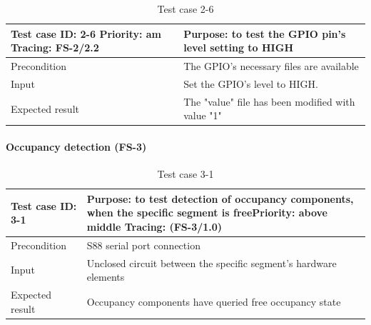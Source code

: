 \begin{table}[H]
	\caption{Test case 2-6}
	\label{table:TCase-FS2-6}
	\begin{center}
		\renewcommand{\arraystretch}{1.8}
		\begin{tabu} 
			to 0.9 \textwidth
			{  X[0.4, c] X[c] }
			\toprule
			Test case ID: 2-6 \newline Priority: am \newline Tracing: FS-2/2.2 & Purpose: to test the GPIO pin's level setting to HIGH \\ \midrule
			Precondition                                                       & The GPIO's necessary files are available              \\
			Input                                                              & Set the GPIO's level to HIGH.                         \\
			Expected result                                                    & The "value" file has been modified with value "1"     \\ \bottomrule
		\end{tabu}
	\end{center}
\end{table} 

\paragraph{Occupancy detection (FS-3)}
\begin{table}[H]
	\caption{Test case 3-1}
	\label{table:TCase-FS3-1}
	\begin{center}
		\renewcommand{\arraystretch}{1.8}
		\begin{tabu} 
			to 0.9 \textwidth
			{  X[0.4, c] X[c] }
			\toprule
			Test case ID: 3-1 & Purpose: to test detection of occupancy components, when the specific segment is free\newline Priority: above middle \newline Tracing: (FS-3/1.0)\\ \midrule
			Precondition & S88 serial port connection  \\
			Input & Unclosed circuit between the specific segment's hardware elements  \\
			Expected result & Occupancy components have queried free occupancy state \\ \bottomrule
		\end{tabu}
	\end{center}
\end{table} 

